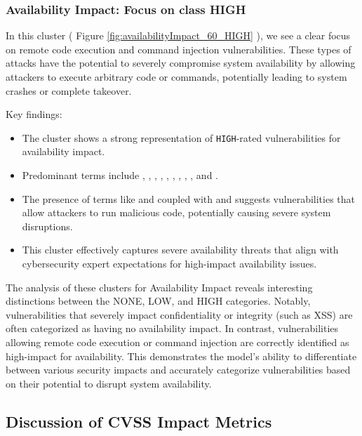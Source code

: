 \subsubsection{Availability Impact: Focus on class HIGH}

In this cluster ( Figure \ref{fig:availabilityImpact_60_HIGH} ), we see a clear focus on remote code execution and command injection vulnerabilities. These types of attacks have the potential to severely compromise system availability by allowing attackers to execute arbitrary code or commands, potentially leading to system crashes or complete takeover.

Key findings:

\begin{itemize}
	\item The cluster shows a strong representation of \texttt{HIGH}-rated vulnerabilities for availability impact.
	\item Predominant terms include , , , , , , , , , and .
	\item The presence of terms like  and  coupled with  and  suggests vulnerabilities that allow attackers to run malicious code, potentially causing severe system disruptions.
	\item This cluster effectively captures severe availability threats that align with cybersecurity expert expectations for high-impact availability issues.
\end{itemize}

The analysis of these clusters for Availability Impact reveals interesting distinctions between the NONE, LOW, and HIGH categories. Notably, vulnerabilities that severely impact confidentiality or integrity (such as XSS) are often categorized as having no availability impact. In contrast, vulnerabilities allowing remote code execution or command injection are correctly identified as high-impact for availability. This demonstrates the model's ability to differentiate between various security impacts and accurately categorize vulnerabilities based on their potential to disrupt system availability.

\subsection{Discussion of CVSS Impact Metrics}

